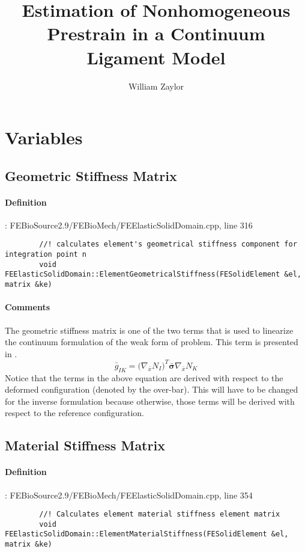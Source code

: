 \documentclass{article}
\author{William Zaylor}
\title{Estimation of Nonhomogeneous Prestrain in a Continuum Ligament Model}
\begin{document}
\section*{Variables}
\subsection*{Geometric Stiffness Matrix}
    \paragraph{Definition}: FEBioSource2.9/FEBioMech/FEElasticSolidDomain.cpp, line 316
    \begin{lstlisting}
        //! calculates element's geometrical stiffness component for integration point n
        void FEElasticSolidDomain::ElementGeometricalStiffness(FESolidElement &el, matrix &ke)
    \end{lstlisting}

    \paragraph{Comments}
    The geometric stiffness matrix is one of the two terms that is used to linearize the continuum formulation of the weak form of problem. This term is presented in \cite[pg. 137, eq 4.107]{wriggers_nonlinear_2008}.
    \begin{equation*}
        \bar{g}_{IK} = \big(\nabla_{\bar{x}}N_I \big)^T \bar{\bm{\sigma}} \nabla_{\bar{x}}N_K
    \end{equation*}
    Notice that the terms in the above equation are derived with respect to the deformed configuration (denoted by the over-bar). This will have to be changed for the inverse formulation because otherwise, those terms will be derived with respect to the reference configuration.

\subsection*{Material Stiffness Matrix}
    \paragraph{Definition}: FEBioSource2.9/FEBioMech/FEElasticSolidDomain.cpp, line 354
    \begin{lstlisting}
        //! Calculates element material stiffness element matrix
        void FEElasticSolidDomain::ElementMaterialStiffness(FESolidElement &el, matrix &ke)
    \end{lstlisting}
\end{document}
